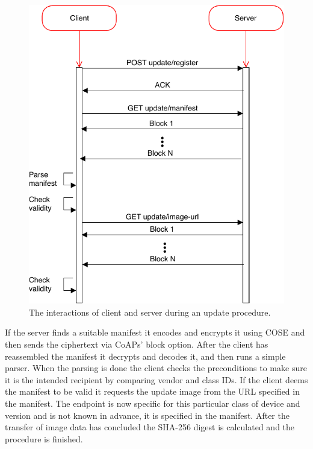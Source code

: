 \documentclass[0-thesis.tex]{subfiles}
\begin{document}
\begin{figure}
    \caption{The interactions of client and server during an update procedure.}
    \label{fig:client-server-interaction}
    \includegraphics{images/client-server-sequence.pdf}
\end{figure}

If the server finds a suitable manifest it encodes and encrypts it using COSE and then
sends the ciphertext via CoAPs' block option. After the client has reassembled the
manifest it decrypts and decodes it, and then runs a simple parser. When the parsing is
done the client checks the preconditions to make sure it is the intended recipient by
comparing vendor and class IDs. If the client deems the manifest to be valid it requests
the update image from the URL specified in the manifest. The endpoint is now specific for
this particular class of device and version and is not known in advance, it is specified
in the manifest. After the transfer of image data has concluded the SHA-256 digest is
calculated and the procedure is finished.
\end{document}
